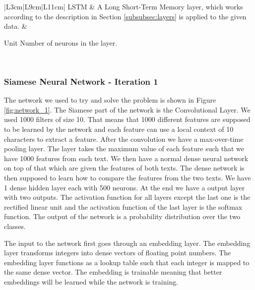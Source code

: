 \begin{landscape}
\begin{table}
\begin{tabular}{|L{3cm}|L{9cm}|L{11cm}|}
            LSTM                                                               &
            A Long Short-Term Memory layer, which works according to the
            description in Section \ref{subsubsec:layers} is applied to the
            given data.                                                        &
            \begin{minipage}[t]{\linewidth}
            \begin{compactdesc}
                \item[Unit] Number of neurons in the layer.
            \end{compactdesc}
            \end{minipage}                                                    \\
            \hline
        \end{tabular}
    \end{table}
\end{landscape}

\subsubsection{Siamese Neural Network - Iteration 1}

The network we used to try and solve the problem is shown in Figure
\ref{fig:network_1}. The Siamese part of the network is the Convolutional
Layer. We used 1000 filters of size 10. That means that 1000 different features
are supposed to be learned by the network and each feature can use a local
context of 10 characters to extract a feature. After the convolution we have a
max-over-time pooling layer. The layer takes the maximum value of each feature
such that we have 1000 features from each text. We then have a normal dense
neural network on top of that which are given the features of both texts. The
dense network is then supposed to learn how to compare the features from the two
texts. We have 1 dense hidden layer each with 500 neurons. At the end we have
a output layer with two outputs. The activation function for all layers except
the last one is the rectified linear unit and the activation function of the
last layer is the softmax function. The output of the network is a probability
distribution over the two classes.

The input to the network first goes through an embedding layer. The embedding
layer transforms integers into dense vectors of floating point numbers. The
embedding layer functions as a lookup table such that each integer is mapped
to the same dense vector. The embedding is trainable meaning that better
embeddings will be learned while the network is training.

